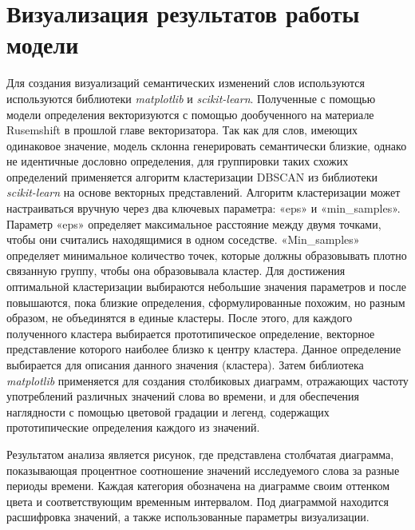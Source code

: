 \documentclass[LI,VKR]{HSEUniversity}
\begin{document}
\section{Визуализация результатов работы модели}

Для создания визуализаций семантических изменений слов используются используются библиотеки
\textit{matplotlib} и \textit{scikit-learn}.
Полученные с помощью модели определения векторизуются с помощью дообученного
на материале Rusemshift в прошлой главе векторизатора.
Так как для слов, имеющих одинаковое значение,
модель склонна генерировать семантически близкие, однако не идентичные дословно определения,
для группировки таких схожих определений применяется алгоритм кластеризации DBSCAN из
библиотеки \textit{scikit-learn} на основе векторных представлений.
Алгоритм кластеризации может настраиваться вручную через два ключевых параметра:
«eps» и «min\_samples».
Параметр «eps» определяет максимальное расстояние между двумя точками,
чтобы они считались находящимися в одном соседстве.
«Min\_samples» определяет минимальное количество точек,
которые должны образовывать плотно связанную группу, чтобы она образовывала кластер.
Для достижения оптимальной кластеризации выбираются небольшие значения параметров и
после повышаются, пока близкие определения, сформулированные похожим, но разным образом,
не объединятся в единые кластеры.
После этого, для каждого полученного кластера выбирается прототипическое определение,
векторное представление которого наиболее близко к центру кластера.
Данное определение выбирается для описания данного значения (кластера).
Затем библиотека \textit{matplotlib} применяется для создания столбиковых диаграмм,
отражающих частоту употреблений различных значений слова во времени,
и для обеспечения наглядности с помощью цветовой градации и легенд,
содержащих прототипические определения каждого из значений.

Результатом анализа является рисунок, где представлена столбчатая диаграмма,
показывающая процентное соотношение значений исследуемого слова за разные периоды времени.
Каждая категория обозначена на диаграмме своим оттенком цвета и соответствующим временным интервалом.
Под диаграммой находится расшифровка значений, а также использованные параметры визуализации.
\end{document}
